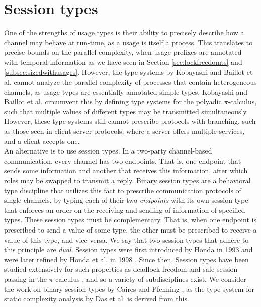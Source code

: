\chapter{Session types}\label{sec:sessiontypes}
One of the strengths of usage types is their ability to precisely describe how a channel may behave at run-time, as a usage is itself a process. This translates to precise bounds on the parallel complexity, when usage prefixes are annotated with temporal information as we have seen in Section \ref{sec:lockfreedomts} and \ref{subsec:sizedwithusages}. However, the type systems by Kobayashi \cite{Kobayashi2000} and Baillot et al. \cite{BaillotEtAl2021} cannot analyze the parallel complexity of processes that contain heterogeneous channels, as usage types are essentially annotated simple types. Kobayashi \cite{Kobayashi2000} and Baillot et al. \cite{BaillotEtAl2021} circumvent this by defining type systems for the polyadic $\pi$-calculus, such that multiple values of different types may be transmitted simultaneously. However, these type systems still cannot prescribe protocols with branching, such as those seen in client-server protocols, where a server offers multiple services, and a client accepts one.\\

An alternative is to use session types. In a two-party channel-based communication, every channel has two endpoints. That is, one endpoint that sends some information and another that receives this information, after which roles may be swapped to transmit a reply. Binary session types are a behavioral type discipline that utilizes this fact to prescribe communication protocols of single channels, by typing each of their two \textit{endpoints} with its own session type that enforces an order on the receiving and sending of information of specified types. These session types must be complementary. That is, when one endpoint is prescribed to send a value of some type, the other must be prescribed to receive a value of this type, and vice versa. We say that two session types that adhere to this principle are \textit{dual}. Session types were first introduced by Honda in 1993 \cite{Honda1993} and were later refined by Honda et al. in 1998 \cite{HondaEtAl1998}. Since then, Session types have been studied extensively for such properties as deadlock freedom \cite{CairesPfenning2010} and safe session passing in the $\pi$-calculus \cite{GiuntiVasconcelos2010,GayHole2005,Vasconcelos2009}, and so a variety of subdisciplines exist. We consider the work on binary session types by Caires and Pfenning \cite{CairesPfenning2010}, as the type system for static complexity analysis by Das et al. \cite{DasEtAl2018} is derived from this.\\ 

